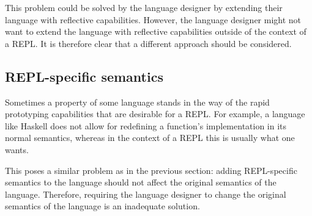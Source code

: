 This problem could be solved by the language designer by extending
their language with reflective capabilities. However, the language
designer might not want to extend the language with reflective
capabilities outside of the context of a REPL. It is therefore clear
that a different approach should be considered.

\subsection{REPL-specific semantics}
\label{ssec:repl-spec-semant}
Sometimes a property of some language stands in the way of the rapid
prototyping capabilities that are desirable for a REPL. For example, a
language like Haskell does not allow for redefining a function's
implementation in its normal semantics, whereas in the context of a
REPL this is usually what one wants.

This poses a similar problem as in the previous section: adding REPL-specific
semantics to the language should not affect the original semantics of the
language. Therefore, requiring the language designer to change the original
semantics of the language is an inadequate solution.

